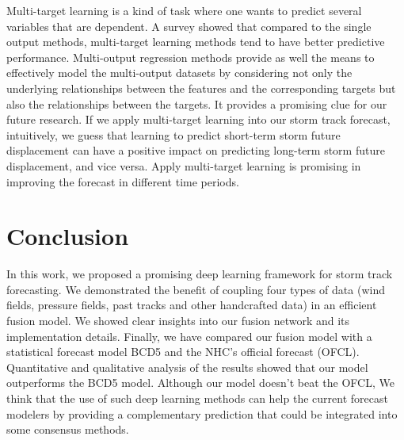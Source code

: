 Multi-target learning is a kind of task where one wants to predict several variables that are dependent. A survey showed that compared to the single output methods, multi-target learning methods tend to have better predictive performance. Multi-output regression methods provide as well the means to effectively model the multi-output datasets by considering not only the underlying relationships between the features and the corresponding targets but also the relationships between the targets. It provides a promising clue for our future research. If we apply multi-target learning into our storm track forecast, intuitively, we guess that learning to predict short-term storm future displacement can have a positive impact on predicting long-term storm future displacement, and vice versa. Apply multi-target learning is promising in improving the forecast in different time periods.

\section{Conclusion}
In this work, we proposed a promising deep learning framework for storm track forecasting. We demonstrated the benefit of coupling four types of data (wind fields, pressure fields, past tracks and other handcrafted data) in an efficient fusion model. We showed clear insights into our fusion network and its implementation details. Finally, we have compared our fusion model with a statistical forecast model BCD5 and the NHC's official forecast (OFCL). Quantitative and qualitative analysis of the results showed that our model outperforms the BCD5 model. Although our model doesn't beat the OFCL, We think that the use of such deep learning methods can help the current forecast modelers by providing a complementary prediction that could be integrated into some consensus methods.



